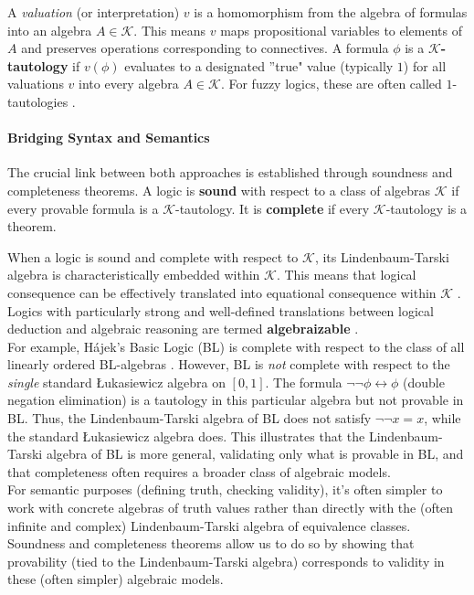 A \textit{valuation} (or interpretation) $v$ is a homomorphism from the algebra of formulas into an algebra $A \in \mathcal{K}$. This means $v$ maps propositional variables to elements of $A$ and preserves operations corresponding to connectives. A formula $\phi$ is a $\mathcal{K}$\textbf{-tautology} if $v(\phi)$ evaluates to a designated ''true" value (typically $1$) for all valuations $v$ into every algebra $A \in \mathcal{K}$. For fuzzy logics, these are often called $1$-tautologies \cite[Ch.~2]{Hajek1998}.

\paragraph{Bridging Syntax and Semantics} The crucial link between both approaches is established through soundness and completeness theorems. A logic is \textbf{sound} with respect to a class of algebras $\mathcal{K}$ if every provable formula is a $\mathcal{K}$-tautology. It is \textbf{complete} if every $\mathcal{K}$-tautology is a theorem.

When a logic is sound and complete with respect to $\mathcal{K}$, its Lindenbaum-Tarski algebra is characteristically embedded within $\mathcal{K}$. This means that logical consequence can be effectively translated into equational consequence within $\mathcal{K}$ \cite[Abstract]{BlokPigozzi1989}. Logics with particularly strong and well-defined translations between logical deduction and algebraic reasoning are termed \textbf{algebraizable} \cite[Def.~2.10]{BlokPigozzi1989}.\\

For example, Hájek's Basic Logic (BL) \cite[Ch.~2]{Hajek1998} is complete with respect to the class of all linearly ordered BL-algebras \cite[Thm.~2.3.15]{Hajek1998}. However, BL is \textit{not} complete with respect to the \textit{single} standard Łukasiewicz algebra on $[0,1]$. The formula $\neg \neg \phi \leftrightarrow \phi$ (double negation elimination) is a tautology in this particular algebra but not provable in BL. Thus, the Lindenbaum-Tarski algebra of BL does not satisfy $\neg \neg x = x$, while the standard Łukasiewicz algebra does. This illustrates that the Lindenbaum-Tarski algebra of BL is more general, validating only what is provable in BL, and that completeness often requires a broader class of algebraic models.\\

For semantic purposes (defining truth, checking validity), it's often simpler to work with concrete algebras of truth values rather than directly with the (often infinite and complex) Lindenbaum-Tarski algebra of equivalence classes. Soundness and completeness theorems allow us to do so by showing that provability (tied to the Lindenbaum-Tarski algebra) corresponds to validity in these (often simpler) algebraic models.\\

